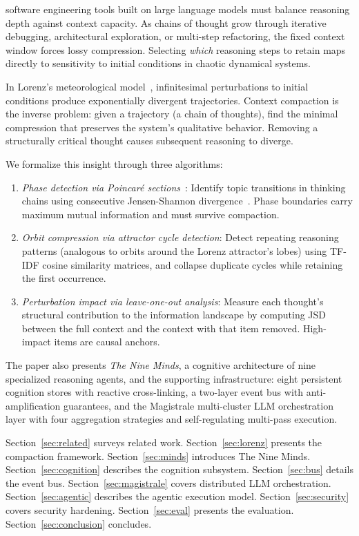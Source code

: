 \documentclass[journal,10pt]{IEEEtran}
\begin{document}
 software engineering tools built on large language models must balance reasoning depth against context capacity. As chains of thought grow through iterative debugging, architectural exploration, or multi-step refactoring, the fixed context window forces lossy compression. Selecting \emph{which} reasoning steps to retain maps directly to sensitivity to initial conditions in chaotic dynamical systems.

In Lorenz's meteorological model~\cite{lorenz1963}, infinitesimal perturbations to initial conditions produce exponentially divergent trajectories. Context compaction is the inverse problem: given a trajectory (a chain of thoughts), find the minimal compression that preserves the system's qualitative behavior. Removing a structurally critical thought causes subsequent reasoning to diverge.

We formalize this insight through three algorithms:

\begin{enumerate}[nosep,label=(\roman*)]
  \item \emph{Phase detection via Poincar\'{e} sections}~\cite{poincare1890}: Identify topic transitions in thinking chains using consecutive Jensen-Shannon divergence~\cite{lin1991}. Phase boundaries carry maximum mutual information and must survive compaction.
  \item \emph{Orbit compression via attractor cycle detection}: Detect repeating reasoning patterns (analogous to orbits around the Lorenz attractor's lobes) using TF-IDF cosine similarity matrices, and collapse duplicate cycles while retaining the first occurrence.
  \item \emph{Perturbation impact via leave-one-out analysis}: Measure each thought's structural contribution to the information landscape by computing JSD between the full context and the context with that item removed. High-impact items are causal anchors.
\end{enumerate}

The paper also presents \emph{The Nine Minds}, a cognitive architecture of nine specialized reasoning agents, and the supporting infrastructure: eight persistent cognition stores with reactive cross-linking, a two-layer event bus with anti-amplification guarantees, and the Magistrale multi-cluster LLM orchestration layer with four aggregation strategies and self-regulating multi-pass execution.

Section~\ref{sec:related} surveys related work. Section~\ref{sec:lorenz} presents the compaction framework. Section~\ref{sec:minds} introduces The Nine Minds. Section~\ref{sec:cognition} describes the cognition subsystem. Section~\ref{sec:bus} details the event bus. Section~\ref{sec:magistrale} covers distributed LLM orchestration. Section~\ref{sec:agentic} describes the agentic execution model. Section~\ref{sec:security} covers security hardening. Section~\ref{sec:eval} presents the evaluation. Section~\ref{sec:conclusion} concludes.
\end{document}
